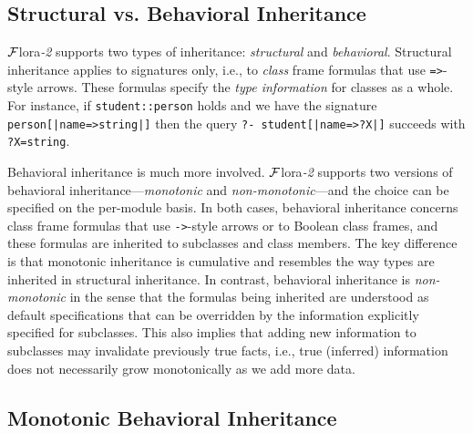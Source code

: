 \documentclass[11pt]{article}
\newcommand{\FLORA}{{\mbox{\sc ${\cal F}${lora}\rm\emph{-2}}}\xspace}
\newcommand{\FLSYSTEM}{\FLORA}
\begin{document}
\subsection{Structural vs. Behavioral Inheritance}

\FLSYSTEM supports two types of inheritance: \emph{structural} and
\emph{behavioral}.  Structural inheritance applies to signatures only,
i.e., to \emph{class} frame formulas that use \texttt{=>}-style arrows.
These formulas specify the \emph{type information}   for classes as a whole.
For instance, if {\tt student::person} holds and we have the signature
\texttt{person[|name=>string|]} then the query {\tt ?- student[|name=>?X|]}
succeeds with {\tt ?X=string}.

Behavioral inheritance is much more involved.
\FLSYSTEM supports two versions of behavioral inheritance---\emph{monotonic}
and \emph{non-monotonic}---and the choice can be specified on the
per-module basis. In both cases, behavioral inheritance concerns
class frame formulas that use \texttt{->}-style arrows or to Boolean class
frames, and these formulas are inherited to subclasses and class members.
The key difference is that monotonic inheritance is cumulative and
resembles the way types are inherited in structural inheritance.
In contrast, behavioral inheritance is \emph{non-monotonic} in the sense
that the formulas being inherited are understood as default specifications
that can be overridden by the information explicitly specified for subclasses.
This also implies that adding new information to subclasses may invalidate
previously true facts, i.e., true (inferred)
information does not necessarily grow monotonically  as we add more data.


\subsection{Monotonic Behavioral Inheritance}
\end{document}
